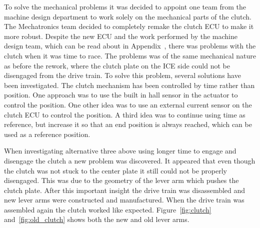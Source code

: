 To solve the mechanical problems it was decided to appoint one team from the
machine design department to work solely on the mechanical parts of the clutch.
The Mechatronics team decided to completely remake the clutch ECU to make it
more robust. Despite the new ECU and the work performed by the machine design
team, which can be read about in Appendix~\cite{MD_report}, there was problems
with the clutch when it was time to race. The problems was of the same
mechanical nature as before the rework, where the clutch plate on the ICE side
could not be disengaged from the drive train. To solve this problem, several
solutions have been investigated. The clutch mechanism has been controlled by
time rather than position. One approach was to use the built in hall sensor in
the actuator to control the position. One other idea was to use an external
current sensor on the clutch ECU to control the position. A third idea was to
continue using time as reference, but increase it so that an end position is
always reached, which can be used as a reference position.

When investigating alternative three above using longer time to engage and
disengage the clutch a new problem was discovered. It appeared that even though
the clutch was not stuck to the center plate it still could not be properly
disengaged. This was due to the geometry of the lever arm which pushes the
clutch plate.  After this important insight the drive train was disassembled and
new lever arms were constructed and manufactured. When the drive train was
assembled again the clutch worked like expected. Figure~\ref{fig:clutch}
and~\ref{fig:old_clutch} shows both the new and old lever arms.

